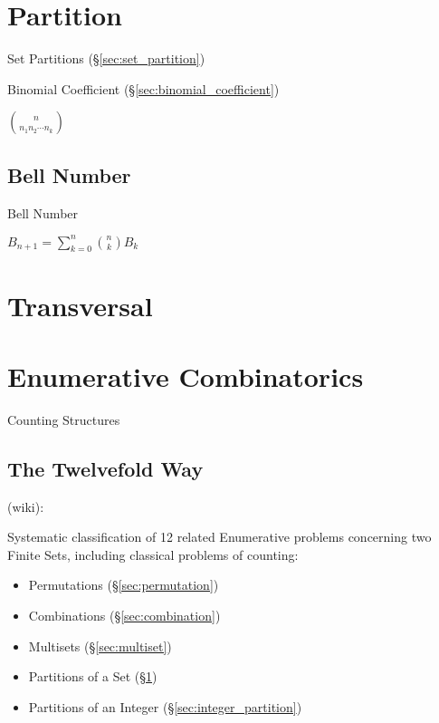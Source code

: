 \section{Partition}\label{sec:partition}

Set Partitions (\S\ref{sec:set_partition})

Binomial Coefficient (\S\ref{sec:binomial_coefficient})

$\binom{n}{n_1 n_2 \cdots n_k}$



\subsection{Bell Number}\label{sec:bell_number}

Bell Number

$B_{n+1} = \sum_{k=0}^n \binom{n}{k} B_k$



\section{Transversal}\label{sec:transversal}

\section{Enumerative Combinatorics}
\label{sec:enumerative_combinatorics}

Counting Structures



\subsection{The Twelvefold Way}\label{sec:twelvefold_way}

(wiki):

Systematic classification of 12 related Enumerative problems concerning two
Finite Sets, including classical problems of counting:
\begin{itemize}
  \item Permutations (\S\ref{sec:permutation})
  \item Combinations (\S\ref{sec:combination})
  \item Multisets (\S\ref{sec:multiset})
  \item Partitions of a Set (\S\ref{sec:partition})
  \item Partitions of an Integer (\S\ref{sec:integer_partition})
\end{itemize}

